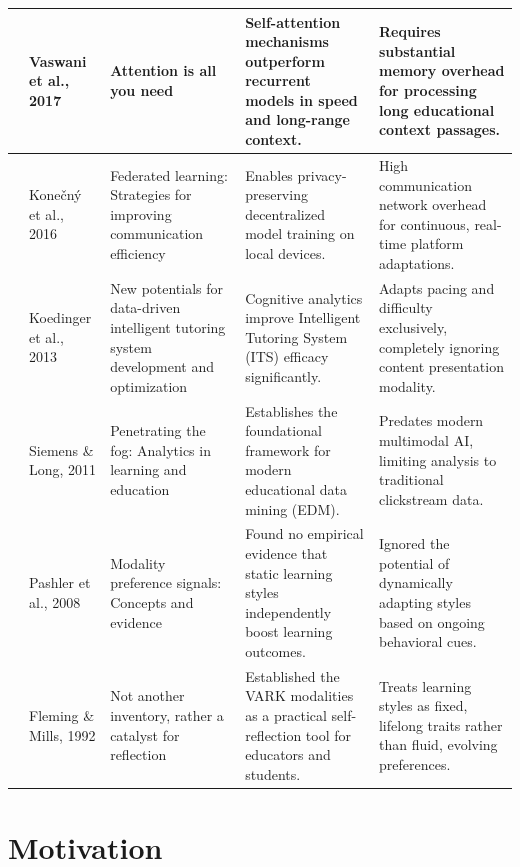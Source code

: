 \begin{longtable}{|p{1.2cm}|p{2.8cm}|p{4.2cm}|p{4.0cm}|p{3.8cm}|}
	\cite{vaswani2017} & Vaswani et al., 2017 & Attention is all you need & Self-attention mechanisms outperform recurrent models in speed and long-range context. & Requires substantial memory overhead for processing long educational context passages. \\
	\hline
	
	\cite{fu2025} & Konečný et al., 2016 & Federated learning: Strategies for improving communication efficiency & Enables privacy-preserving decentralized model training on local devices. & High communication network overhead for continuous, real-time platform adaptations. \\
	\hline
	
	\cite{koedinger2012} & Koedinger et al., 2013 & New potentials for data-driven intelligent tutoring system development and optimization & Cognitive analytics improve Intelligent Tutoring System (ITS) efficacy significantly. & Adapts pacing and difficulty exclusively, completely ignoring content presentation modality. \\
	\hline
	
	\cite{siemens2013} & Siemens \& Long, 2011 & Penetrating the fog: Analytics in learning and education & Establishes the foundational framework for modern educational data mining (EDM). & Predates modern multimodal AI, limiting analysis to traditional clickstream data. \\
	\hline
	
	\cite{pashler2008} & Pashler et al., 2008 & Modality preference signals: Concepts and evidence & Found no empirical evidence that static learning styles independently boost learning outcomes. & Ignored the potential of dynamically adapting styles based on ongoing behavioral cues. \\
	\hline
	
	\cite{fleming1992} & Fleming \& Mills, 1992 & Not another inventory, rather a catalyst for reflection & Established the VARK modalities as a practical self-reflection tool for educators and students. & Treats learning styles as fixed, lifelong traits rather than fluid, evolving preferences. \\
	\hline
	
\end{longtable}
\normalsize
\renewcommand{\arraystretch}{1}

\section[Motivation]{\textbf{Motivation}}

